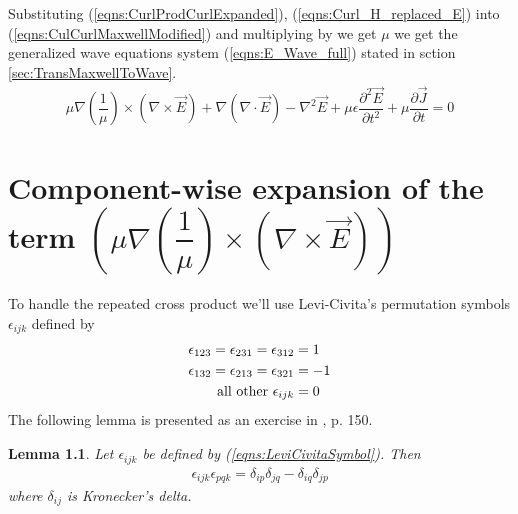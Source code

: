 \documentclass[12pt,twoside]{report}
\newtheorem{lem}{Lemma}[subsubsection]
\begin{document}
\begin{appendices}
Substituting (\ref{eqns:CurlProdCurlExpanded}), (\ref{eqns:Curl_H_replaced_E}) into (\ref{eqns:CulCurlMaxwellModified}) and multiplying by we get $\mu$ we get the generalized wave equations system (\ref{eqns:E_Wave_full}) stated in sction \ref{sec:TransMaxwellToWave}. 
\begin{align}
\mu \nabla \left( \dfrac{1}{\mu} \right) \times \left(\nabla \times \overrightarrow{E} \right) +  \nabla (\nabla \cdot \overrightarrow{E}) - \nabla^2 \overrightarrow{E} + \mu \epsilon\dfrac{\partial^2 \overrightarrow{E}}{\partial t^2} + \mu \dfrac{\partial \overrightarrow{J}}{\partial t} = 0
\end{align}

\chapter{Component-wise expansion of the term $\left(\mu \nabla \left( \dfrac{1}{\mu}\right) \times \left(\nabla \times \vec{E} \right) \right)$}
\label{append:GradLogTermComponenetwiseDeriv}
To handle the repeated cross product we'll use Levi-Civita's permutation symbols $\epsilon_{ijk}$ \cite{ArfkenWeber2005} defined by
\begin{align}
\label{eqns:LeviCivitaSymbol}
\epsilon_{123} = \epsilon_{231} = \epsilon_{312} & = 1	\notag\\
\epsilon_{132} = \epsilon_{213} = \epsilon_{321} &= -1 \\
\text{all other } \epsilon_{ijk} &= 0	\notag
\end{align}
The following lemma is presented as an exercise in \cite{ArfkenWeber2005}, p. 150.
\begin{lem}
\label{lem:LiviCivitaEpsDelta}
Let $\epsilon_{ijk}$ be defined by (\ref{eqns:LeviCivitaSymbol}). Then
\begin{align}
\label{eqns:LiviCivitaEpsilonDelta} 
\epsilon_{ijk} \epsilon_{pqk} = \delta_{ip} \delta_{jq} - \delta_{iq} \delta_{jp}
\end{align} 
where $\delta_{ij}$ is Kronecker's delta.
\end{lem}


\end{appendices}
\end{document}
